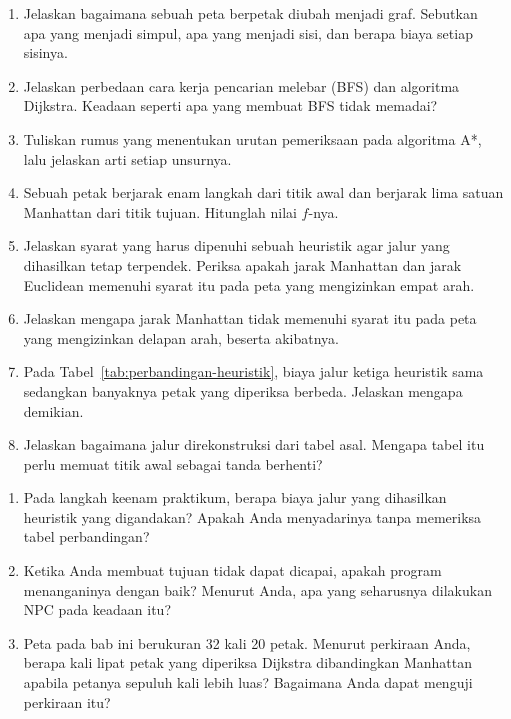 
\begin{enumerate}
  \item Jelaskan bagaimana sebuah peta berpetak diubah menjadi graf. Sebutkan
        apa yang menjadi simpul, apa yang menjadi sisi, dan berapa biaya setiap
        sisinya.

  \item Jelaskan perbedaan cara kerja pencarian melebar (BFS) dan algoritma
        Dijkstra. Keadaan seperti apa yang membuat BFS tidak memadai?

  \item Tuliskan rumus yang menentukan urutan pemeriksaan pada algoritma A*,
        lalu jelaskan arti setiap unsurnya.

  \item Sebuah petak berjarak enam langkah dari titik awal dan berjarak lima
        satuan Manhattan dari titik tujuan. Hitunglah nilai $f$-nya.

  \item Jelaskan syarat yang harus dipenuhi sebuah heuristik agar jalur yang
        dihasilkan tetap terpendek. Periksa apakah jarak Manhattan dan jarak
        Euclidean memenuhi syarat itu pada peta yang mengizinkan empat arah.

  \item Jelaskan mengapa jarak Manhattan tidak memenuhi syarat itu pada peta
        yang mengizinkan delapan arah, beserta akibatnya.

  \item Pada Tabel~\ref{tab:perbandingan-heuristik}, biaya jalur ketiga
        heuristik sama sedangkan banyaknya petak yang diperiksa berbeda.
        Jelaskan mengapa demikian.

  \item Jelaskan bagaimana jalur direkonstruksi dari tabel asal. Mengapa tabel
        itu perlu memuat titik awal sebagai tanda berhenti?
\end{enumerate}

\begin{refleksibox}
\begin{enumerate}
  \item Pada langkah keenam praktikum, berapa biaya jalur yang dihasilkan
        heuristik yang digandakan? Apakah Anda menyadarinya tanpa memeriksa
        tabel perbandingan?
  \item Ketika Anda membuat tujuan tidak dapat dicapai, apakah program
        menanganinya dengan baik? Menurut Anda, apa yang seharusnya dilakukan
        NPC pada keadaan itu?
  \item Peta pada bab ini berukuran 32 kali 20 petak. Menurut perkiraan Anda,
        berapa kali lipat petak yang diperiksa Dijkstra dibandingkan Manhattan
        apabila petanya sepuluh kali lebih luas? Bagaimana Anda dapat menguji
        perkiraan itu?
\end{enumerate}
\end{refleksibox}
